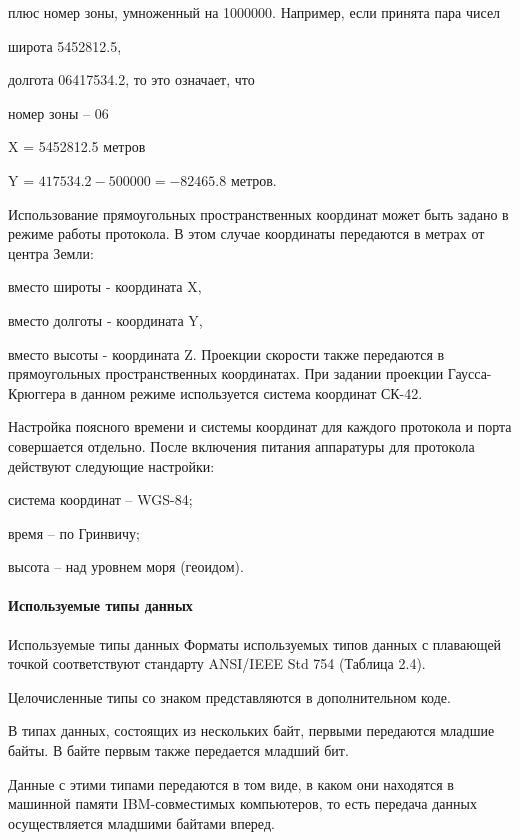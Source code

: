 плюс номер зоны, умноженный на 1000000.
\newline Например, если принята пара чисел

широта 5452812.5,

долгота 06417534.2,
\newline то это означает, что

номер зоны -- 06

X = 5452812.5 метров

Y = $417534.2-500000=-82465.8$ метров.

Использование прямоугольных пространственных координат может быть задано в
режиме работы протокола. В этом случае координаты передаются в метрах от центра
Земли:

вместо широты - координата X,

вместо долготы - координата Y,

вместо высоты - координата Z.
\newline Проекции скорости также передаются в прямоугольных пространственных координатах.
При задании проекции Гаусса-Крюггера в данном режиме используется система
координат СК-42.

Настройка поясного времени и системы координат для каждого протокола и порта
совершается отдельно.
После включения питания аппаратуры для протокола действуют следующие
настройки:

система координат -- WGS-84;

время -- по Гринвичу;

высота -- над уровнем моря (геоидом).

\paragraph{Используемые типы данных}

Используемые типы данных
Форматы используемых типов данных с плавающей точкой соответствуют стандарту
ANSI/IEEE Std 754 (Таблица 2.4).

Целочисленные типы со знаком представляются в дополнительном коде.

В типах данных, состоящих из нескольких байт, первыми передаются младшие
байты. В байте первым также передается младший бит.

Данные с этими типами передаются в том виде, в каком они находятся в машинной
памяти IBM-совместимых компьютеров, то есть передача данных осуществляется
младшими байтами вперед.

